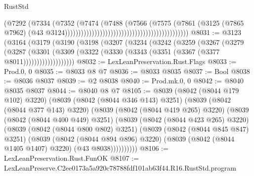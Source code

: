 \begin{lexlean}{RustStd}
\begin{coremodule}
                                                                            (@7292
                                                                              (@7334
                                                                                (@7352
                                                                                  (@7474
                                                                                    (@7488
                                                                                      (@7566
                                                                                        (@7575
                                                                                          (@7861
                                                                                            (@3125
                                                                                              (@7865
                                                                                                @7962)
                                                                                              (@43
                                                                                                @3124))))))))))))))))))))))))))))))))))))))))))))))
@8031 := @3123
    (@3164
      (@3179
        (@3190
          (@3198
            (@3207
              (@3234
                (@3242
                  (@3259
                    (@3267
                      (@3279
                        (@3287
                          (@3301
                            (@3309
                              (@3322 (@3330 (@3343 (@3351 (@3367 (@3377 @8011)))))))))))))))))))
@8032 := LexLeanPreservation.Rust.Flags
@8033 := Prod.{0, 0}
@8035 := @8033 @8 @7
@8036 := @8033 @8035
@8037 := Bool
@8038 := @8036 @8037
@8039 := @2 @8038
@8040 := Prod.mk.{0, 0}
@8042 := @8040 @8035 @8037
@8044 := @8040 @8 @7
@8105 := @8039
    (@8042 (@8044 @179 @102) @3220)
    (@8039
      (@8042 (@8044 @346 @143) @3251)
      (@8039
        (@8042 (@8044 @377 @143) @3220)
        (@8039
          (@8042 (@8044 @419 @265) @3220)
          (@8039
            (@8042 (@8044 @400 @449) @3251)
            (@8039
              (@8042 (@8044 @423 @265) @3220)
              (@8039
                (@8042 (@8044 @800 @802) @3251)
                (@8039
                  (@8042 (@8044 @845 @847) @3251)
                  (@8039
                    (@8042 (@8044 @894 @896) @3220)
                    (@8039 (@8042 (@8044 @1405 @1407) @3220) (@43 @8038))))))))))
@8106 := LexLeanPreservation.Rust.FunOK
@8107 := LexLeanPreserve.C2ee0173a5a920c78788fdf101ab63f44.R16.RustStd.program

\end{coremodule}
\end{lexlean}
